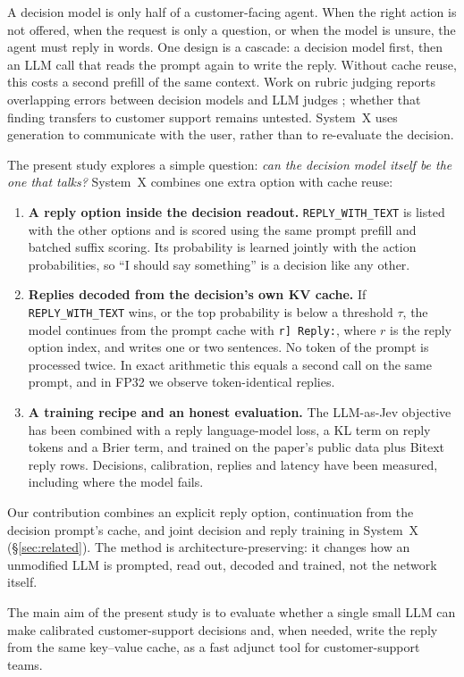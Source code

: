 \documentclass[11pt]{article}
\newcommand{\reply}{\texttt{REPLY\_WITH\_TEXT}}
\begin{document}
A decision model is only half of a customer-facing agent. When the right action is not offered, when the request is only a question, or when the model is unsure, the agent must reply in words. One design is a cascade: a decision model first, then an LLM call that reads the prompt again to write the reply. Without cache reuse, this costs a second prefill of the same context. Work on rubric judging reports overlapping errors between decision models and LLM judges \citep{rao2026rubric}; whether that finding transfers to customer support remains untested. System~X uses generation to communicate with the user, rather than to re-evaluate the decision.

The present study explores a simple question: \emph{can the decision model itself be the one that talks?} System~X combines one extra option with cache reuse:

\begin{enumerate}
\item \textbf{A reply option inside the decision readout.} \reply{} is listed with the other options and is scored using the same prompt prefill and batched suffix scoring. Its probability is learned jointly with the action probabilities, so ``I should say something'' is a decision like any other.
\item \textbf{Replies decoded from the decision's own KV cache.} If \reply{} wins, or the top probability is below a threshold $\tau$, the model continues from the prompt cache with \texttt{r] Reply:}, where $r$ is the reply option index, and writes one or two sentences. No token of the prompt is processed twice. In exact arithmetic this equals a second call on the same prompt, and in FP32 we observe token-identical replies.
\item \textbf{A training recipe and an honest evaluation.} The LLM-as-Jev objective has been combined with a reply language-model loss, a KL term on reply tokens and a Brier term, and trained on the paper's public data plus Bitext reply rows. Decisions, calibration, replies and latency have been measured, including where the model fails.
\end{enumerate}

Our contribution combines an explicit reply option, continuation from the decision prompt's cache, and joint decision and reply training in System~X (\S\ref{sec:related}). The method is architecture-preserving: it changes how an unmodified LLM is prompted, read out, decoded and trained, not the network itself.

The main aim of the present study is to evaluate whether a single small LLM can make calibrated customer-support decisions and, when needed, write the reply from the same key--value cache, as a fast adjunct tool for customer-support teams.
\end{document}
